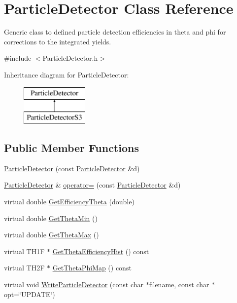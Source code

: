 \hypertarget{classParticleDetector}{\section{Particle\-Detector Class Reference}
\label{classParticleDetector}
}


Generic class to defined particle detection efficiencies in theta and phi for corrections to the integrated yields.  




{\ttfamily \#include $<$Particle\-Detector.\-h$>$}

Inheritance diagram for Particle\-Detector\-:\begin{figure}[H]
\begin{center}
\leavevmode
\includegraphics[height=2.000000cm]{classParticleDetector}
\end{center}
\end{figure}
\subsection*{Public Member Functions}
\begin{DoxyCompactItemize}
\item 
\hyperlink{classParticleDetector_ae4e67f0c8345fdc41aae3773b7207c32}{Particle\-Detector} (const \hyperlink{classParticleDetector}{Particle\-Detector} \&d)
\item 
\hyperlink{classParticleDetector}{Particle\-Detector} \& \hyperlink{classParticleDetector_aa0f3176c3ce050c7922631d14e4917b4}{operator=} (const \hyperlink{classParticleDetector}{Particle\-Detector} \&d)
\item 
virtual double \hyperlink{classParticleDetector_aaa0f7a2570187065fa058686fc5a8d47}{Get\-Efficiency\-Theta} (double)
\item 
virtual double \hyperlink{classParticleDetector_a67d7e51f3c565dd6cff3ff0225bd6572}{Get\-Theta\-Min} ()
\item 
virtual double \hyperlink{classParticleDetector_ad0380f4df4bbbaf307b4b475b337dd5b}{Get\-Theta\-Max} ()
\item 
virtual T\-H1\-F $\ast$ \hyperlink{classParticleDetector_aee088d19449faa1a4658a25f3e9a8491}{Get\-Theta\-Efficiency\-Hist} () const 
\item 
virtual T\-H2\-F $\ast$ \hyperlink{classParticleDetector_a35f50afc4ffafcf9a9ff86e06cb5fa30}{Get\-Theta\-Phi\-Map} () const 
\item 
virtual void \hyperlink{classParticleDetector_a8f27064544d26812431e508fefdf4945}{Write\-Particle\-Detector} (const char $\ast$filename, const char $\ast$opt=\char`\"{}U\-P\-D\-A\-T\-E\char`\"{})
\end{DoxyCompactItemize}
